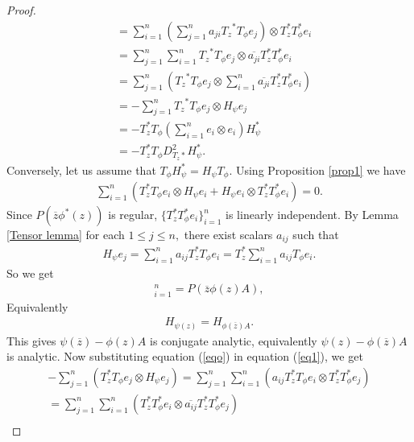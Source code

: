 \documentclass[12pt, reqno]{amsart}
\theoremstyle{definition}
\theoremstyle{remark}
\numberwithin{equation}{section}
\begin{document}
\begin{proof}
\begin{align*}
            &=\sum_{i=1}^{n}(\sum_{j=1}^{n}a_{ji}{T_z}^*T_\phi e_j) \otimes T_z^*T^*_\phi e_i\\
            &=\sum_{j=1}^{n}\sum_{i=1}^{n}{T_z}^*T_\phi e_j \otimes \overline{a_{ji}}T_z^*T^*_\phi e_i\\
            &=\sum_{j=1}^{n}({T_z}^*T_\phi e_j \otimes \sum_{i=1}^{n} \overline{a_{ji}}T_z^*T^*_\phi e_i)\\
            &=-\sum_{j=1}^{n}{T_z}^*T_\phi e_j \otimes H_\psi e_j\\
            &=-T_z^*T_\phi (\sum_{i=1}^{n} e_i\otimes e_i) H_\psi^*\\
            &=-T_z^*T_\phi D^2_{T_z*} H_\psi^*.
        \end{align*}
        Conversely, let us assume that $T_\phi H^*_\psi =H_\psi T_\phi$. Using Proposition \ref{prop1} we have 
           \begin{align}\label{eq1}
             \sum_{i=1}^{n} (T_z^*T_\phi e_i \otimes H_\psi e_i + H_\psi e_i \otimes T^*_zT^*_\phi e_i)=0.
           \end{align}
            Since $P(\overline z \phi^*(z))$ is regular, $\{T^*_zT^*_\phi e_i\}_{i=1}^{n}$ is linearly independent. By Lemma \ref{Tensor lemma} for each $1\leq j\leq n,$
            there exist scalars $a_{ij}$ such that
            \begin{align}
                H_\psi e_j = \sum_{i=1}^{n}a_{ij}T_z^*T_\phi e_i
                =T^*_z\sum_{i=1}^{n}a_{ij}T_\phi e_i\label{eqo}.
            \end{align}
            So we get
            \begin{align*}
                [H_{\psi(z)}e_i]_{i=1}^{n}=P(\overline z \phi(z)A),
             \end{align*}
             Equivalently
             \begin{align*}
                 H_{\psi(z)}=H_{\phi(\overline z)A}.
             \end{align*}
            This gives $\psi(\overline z)-\phi(z)A$ is conjugate analytic, equivalently $\psi(z)-\phi(\overline z)A$ is analytic.
            Now substituting equation (\ref{eqo}) in equation (\ref{eq1}), we get
            \begin{align*}
            -\sum_{j=1}^{n} (T_z^*T_\phi e_j \otimes H_\psi e_j )=\sum_{j=1}^{n}\sum_{i=1}^{n}(a_{ij}T_z^*T_\phi e_i \otimes T^*_zT^*_\phi e_j)\\
            = \sum_{j=1}^{n}\sum_{i=1}^{n}(T_z^*T^*_\phi e_i \otimes \overline{a_{ij}}T^*_zT^*_\phi e_j)\\

\end{align*}
\end{proof}
\end{document}
